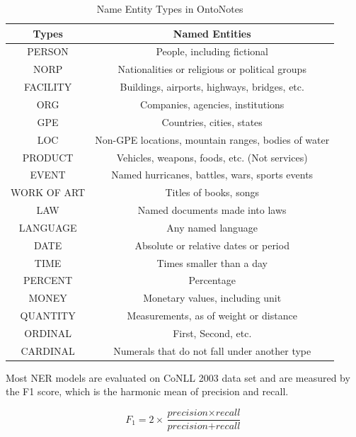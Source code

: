 \begin{table}[h]
\centering
\caption{Name Entity Types in OntoNotes}
\label{table:ontonotes-type}
\begin{tabular}{|c|c|} \hline
Types  & Named Entities  \\ \hline
PERSON & People, including fictional \\ \hline
NORP & Nationalities or religious or political groups \\\hline
FACILITY & Buildings, airports, highways, bridges, etc. \\ \hline
ORG & Companies, agencies, institutions \\ \hline
GPE & Countries, cities, states \\ \hline
LOC & Non-GPE locations, mountain ranges, bodies of water \\ \hline
PRODUCT & Vehicles, weapons, foods, etc. (Not services) \\ \hline
EVENT & Named hurricanes, battles, wars, sports events \\ \hline
WORK OF ART & Titles of books, songs \\ \hline
LAW & Named documents made into laws \\ \hline
LANGUAGE & Any named language  \\ \hline
DATE & Absolute or relative dates or period \\ \hline
TIME & Times smaller than a day  \\ \hline 
PERCENT & Percentage \\ \hline
MONEY & Monetary values, including unit \\ \hline
QUANTITY & Measurements, as of weight or distance \\ \hline
ORDINAL & First, Second, etc. \\ \hline
CARDINAL & Numerals that do not fall under another type \\ \hline
\end{tabular}
\end{table}

Most NER models are evaluated on CoNLL 2003 data set and are measured by the F1 score, which is the harmonic mean of precision and recall. 

\begin{equation}
F_{1} = 2\times \dfrac{\textit{precision} \times \textit{recall}}{\textit{precision} + \textit{recall}}
\end{equation}

